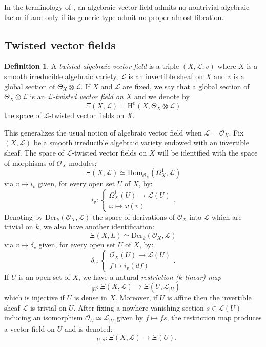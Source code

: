 \documentclass[12pt]{amsart}
\theoremstyle{definition}
\newtheorem{definition}{Definition}[subsection]
\theoremstyle{plain}
\theoremstyle{exampstyle}
\theoremstyle{exampstyle}\newtheorem{thmxbis}{Theorem}
\numberwithin{equation}{section}
\theoremstyle{remark}
\begin{document}
In the terminology of \cite{Freitag-Jaoui-Moosa, Jaoui-Moosa}, an algebraic vector field admits no nontrivial algebraic factor if and only if its generic type admit no proper almost fibration.
\subsection{Twisted vector fields} 

\begin{definition} 
A {\em{twisted algebraic vector field}} is a triple $(X,\mathcal L, v)$ where $X$ is a smooth irreducible algebraic variety, $\mathcal L$ is an invertible sheaf on $X$ and $v$ is a global section of $\Theta_X \otimes \mathcal L$. If $X$ and $\mathcal L$ are fixed, we say that a global section of $\Theta_X \otimes \mathcal L$ is  an {\em $\mathcal L$-twisted vector field on $X$} and we denote by 
$$ \Xi(X,\mathcal L) = \mathrm{H}^0(X, \Theta_X \otimes \mathcal L)$$
the space of $\mathcal L$-twisted vector fields on $X$.
\end{definition} 
This generalizes the usual notion of algebraic vector field when $\mathcal L = \mathcal O_X$. Fix $(X,\mathcal L)$ be a smooth irreducible algebraic variety endowed with an invertible sheaf. The space of $\mathcal L$-twisted vector fields on $X$ will be identified with the space of morphisms of $\mathcal O_X$-modules:
$$ \Xi(X,\mathcal L)  \simeq \mathrm{Hom}_{\mathcal O_X}(\Omega^1_X , \mathcal L)$$
via $v \mapsto i_v$ given, for every open set $U$ of $X$, by:
\begin{equation}
 i_v: \begin{cases} 
 \Omega^1_X(U) \rightarrow \mathcal L(U)  \\ 
\omega \mapsto \omega(v) 
\end{cases}.
\end{equation}
Denoting by $\mathrm{Der}_k(\mathcal O_X,\mathcal L)$ the space of derivations of $\mathcal O_X$ into $\mathcal L$ which are trivial on $k$, we also have another identification:  
$$ 
\Xi(X,L)  \simeq \mathrm{Der}_k(\mathcal O_X, \mathcal L) $$ 
via $v \mapsto \delta_v$ given, for every open set $U$ of $X$, by:
\begin{equation}\label{derivation-definition}
\delta_v : \begin{cases} \mathcal O_X(U) \rightarrow \mathcal L(U)  \\
f \mapsto i_v(df)
\end{cases}.
\end{equation}
If $U$ is an open set of $X$, we have a natural {\em restriction ($k$-linear) map}
$$-_{\mid U} : \Xi(X,\mathcal L) \rightarrow \Xi(U, \mathcal L_{\mid U})$$ 
which is injective if $U$ is dense in $X$.  Moreover, if $U$ is affine then the invertible sheaf $\mathcal L$ is trivial on $U$. After fixing a nowhere vanishing section $s \in \mathcal L(U)$ inducing an isomorphism 
$\mathcal O_U \simeq \mathcal L_{\mid U}$
given by $ f\mapsto fs$, the restriction map produces a vector field on $U$ and is denoted:
$$-_{\mid U,s}: \Xi(X,\mathcal L) \rightarrow \Xi(U).$$ 
\end{document}
